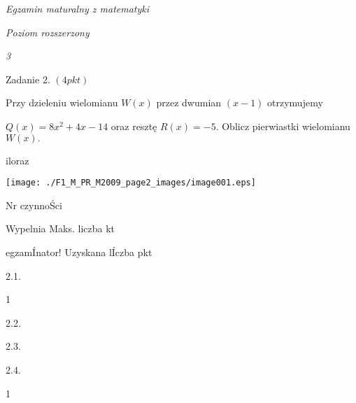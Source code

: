 \documentclass[a4paper,12pt]{article}
\begin{document}
{\it Egzamin maturalny z matematyki}

{\it Poziom rozszerzony}

{\it 3}

Zadanie 2. $(4pkt)$

Przy dzieleniu wielomianu $W(x)$ przez dwumian $(x-1)$ otrzymujemy

$Q(x)=8x^{2}+4x-14$ oraz resztę $R(x)=-5$. Oblicz pierwiastki wielomianu $W(x).$

iloraz
\begin{center}
\texttt{[image: ./F1\_M\_PR\_M2009\_page2\_images/image001.eps]}
\end{center}
Nr czynnoŚci

Wypelnia Maks. liczba kt

egzamÍnator! Uzyskana lÍczba pkt

2.1.

1

2.2.

2.3.

2.4.

1
\end{document}
